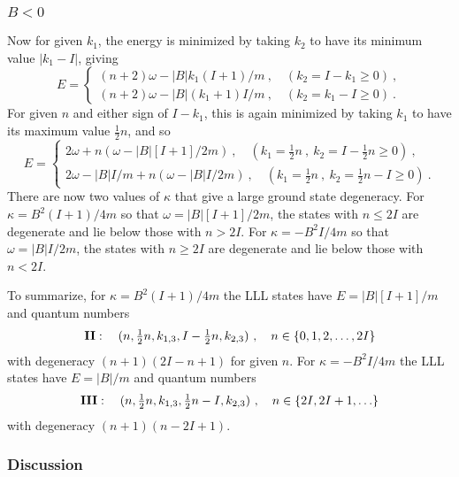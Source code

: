 \documentclass[a4paper,12pt]{article}
\newcommand{\half}{{\textstyle \frac{1}{2}}}
\begin{document}
\subsubsection{$B < 0$}

Now for given $k_1$, the energy is minimized by taking $k_2$ to have its
minimum value $|k_1 - I|$, giving
\begin{equation}
E = \left\{ \begin{array}{l} (n+2)\omega - |B| k_1 (I+1)/m
\ ,\quad (k_2 = I - k_1 \geq 0)\ ,
\\[4pt]
(n+2)\omega - |B| (k_1 + 1) I/m
\ ,\quad (k_2 = k_1 - I \geq 0)\ .
\end{array}
\right.
\end{equation}
For given $n$ and either sign of $I-k_1$, this is again minimized by
taking
$k_1$ to have its maximum value $\half n$, and so
\begin{equation}
E = \left\{ \begin{array}{l} 2 \omega + n (\omega - |B|[I+1]/2m )
\ ,\quad (k_1 = \half n\ ,\ k_2 = I-\half n \geq 0)\ ,
\\[4pt]
2 \omega - |B| I/m + n (\omega - |B| I /2m)
\ ,\quad (k_1 = \half n\ ,\ k_2 = \half n - I \geq 0)\ .
\end{array}
\right.
\end{equation}
There are now two values of $\kappa$ that give a large ground state
degeneracy. For $\kappa = B^2 (I+1)/4m$ so that $\omega = |B|[I+1]/2m$, the
states with
$n \leq 2I$ are degenerate and lie below those with $n > 2I$.
For $\kappa = - B^2 I/4m$ so that $\omega = |B|I/2m$, the states with 
$n \geq 2I$ are degenerate and lie below those with $n < 2I$.

To summarize, for
$\kappa = B^2 (I+1)/4m$ the LLL states have
$E = |B|[I+1]/m$ and quantum numbers
\begin{equation}
{\bf II}:\quad (n, \half n, k_{1,3}, I - \half n , k_{2,3})\ ,\quad
n \in \{0,1,2,\ldots , 2I\}
\label{lll2}
\end{equation}
with degeneracy $(n+1) (2I-n+1)$ for given $n$.  
For $\kappa = -B^2 I/4m$ the LLL states have $E =
|B|/m$ and quantum numbers
\begin{equation}
{\bf III}:\quad (n, \half n, k_{1,3}, \half n - I , k_{2,3})\ ,\quad
n \in \{2I,2I+1,\ldots \}
\label{lll3}
\end{equation}
with degeneracy $(n+1) (n - 2I+1)$.  

\subsubsection{Discussion}
\end{document}

